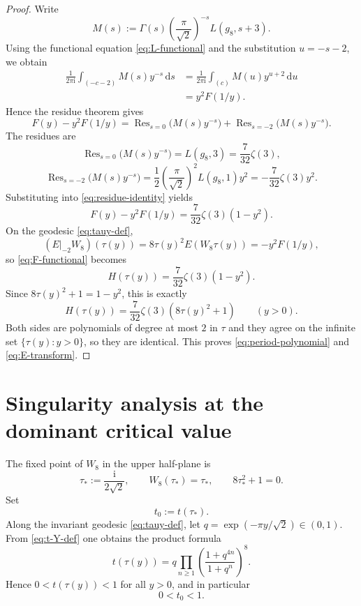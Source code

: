 \documentclass[11pt]{amsart}
\numberwithin{equation}{section}
\theoremstyle{plain}
\theoremstyle{definition}
\theoremstyle{remark}
\newcommand{\dd}{\mathrm{d}}
\newcommand{\ii}{\mathrm{i}}
\DeclareMathOperator{\Res}{Res}
\begin{document}
\begin{proof}
Write
\[
M(s):=\Gamma(s)\left(\frac{\pi}{\sqrt2}\right)^{-s}L(g_8,s+3).
\]
Using the functional equation \eqref{eq:L-functional} and the substitution $u=-s-2$, we obtain
\begin{align*}
\frac{1}{2\pi\ii}\int_{(-c-2)}M(s)y^{-s}\,\dd s
&=\frac{1}{2\pi\ii}\int_{(c)}M(u)y^{u+2}\,\dd u\\
&=y^2F(1/y).
\end{align*}
Hence the residue theorem gives
\begin{equation}\label{eq:residue-identity}
F(y)-y^2F(1/y)
=\Res_{s=0}\bigl(M(s)y^{-s}\bigr)+\Res_{s=-2}\bigl(M(s)y^{-s}\bigr).
\end{equation}
The residues are
\[
\Res_{s=0}\bigl(M(s)y^{-s}\bigr)=L(g_8,3)=\frac{7}{32}\zeta(3),
\]
\[
\Res_{s=-2}\bigl(M(s)y^{-s}\bigr)
=\frac12\left(\frac{\pi}{\sqrt2}\right)^2L(g_8,1)y^2
=-\frac{7}{32}\zeta(3)y^2.
\]
Substituting into \eqref{eq:residue-identity} yields
\begin{equation}\label{eq:F-functional}
F(y)-y^2F(1/y)=\frac{7}{32}\zeta(3)(1-y^2).
\end{equation}
On the geodesic \eqref{eq:tauy-def},
\[
(E|_{-2}W_8)(\tau(y))=8\tau(y)^2E(W_8\tau(y))=-y^2F(1/y),
\]
so \eqref{eq:F-functional} becomes
\[
H(\tau(y))=\frac{7}{32}\zeta(3)(1-y^2).
\]
Since $8\tau(y)^2+1=1-y^2$, this is exactly
\[
H(\tau(y))=\frac{7}{32}\zeta(3)(8\tau(y)^2+1)
\qquad(y>0).
\]
Both sides are polynomials of degree at most $2$ in $\tau$ and they agree on the infinite set $\{\tau(y):y>0\}$, so they are identical. This proves \eqref{eq:period-polynomial} and \eqref{eq:E-transform}.
\end{proof}

\section{Singularity analysis at the dominant critical value}\label{sec:singularity}

The fixed point of $W_8$ in the upper half-plane is
\begin{equation}\label{eq:tau-star}
\tau_*:=\frac{\ii}{2\sqrt2},
\qquad
W_8(\tau_*)=\tau_*,
\qquad
8\tau_*^2+1=0.
\end{equation}
Set
\begin{equation}\label{eq:t0-def}
t_0:=t(\tau_*).
\end{equation}
Along the invariant geodesic \eqref{eq:tauy-def}, let $q=\exp(-\pi y/\sqrt2)\in(0,1)$. From \eqref{eq:t-Y-def} one obtains the product formula
\begin{equation}\label{eq:t-product}
t(\tau(y))
=q\prod_{n\ge 1}\left(\frac{1+q^{4n}}{1+q^n}\right)^8.
\end{equation}
Hence $0<t(\tau(y))<1$ for all $y>0$, and in particular
\begin{equation}\label{eq:t0-range}
0<t_0<1.
\end{equation}
\end{document}
